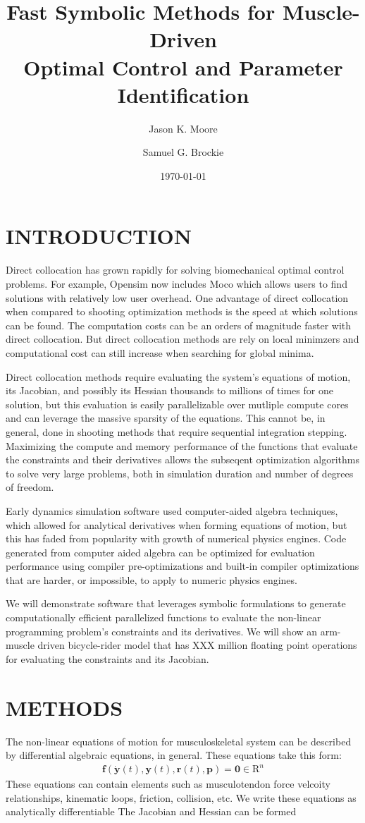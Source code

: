 \documentclass[11pt,twocolumn]{article}
\title{Fast Symbolic Methods for Muscle-Driven\\Optimal Control and Parameter
Identification}
\author{Jason K. Moore \and Samuel G. Brockie}
\date{\today}
\begin{document}
\maketitle
\section*{INTRODUCTION}
%
Direct collocation has grown rapidly for solving biomechanical optimal control
problems. For example, Opensim now includes Moco which allows users to find
solutions with relatively low user overhead. One advantage of direct
collocation when compared to shooting optimization methods is the speed at
which solutions can be found. The computation costs can be an orders of
magnitude faster with direct collocation. But direct collocation methods are
rely on local minimzers and computational cost can still increase when
searching for global minima.

Direct collocation methods require evaluating the system's equations of motion,
its Jacobian, and possibly its Hessian thousands to millions of times for one
solution, but this evaluation is easily parallelizable over mutliple compute
cores and can leverage the massive sparsity of the equations. This cannot be,
in general, done in shooting methods that require sequential integration
stepping. Maximizing the compute and memory performance of the functions that
evaluate the constraints and their derivatives allows the subseqent
optimization algorithms to solve very large problems, both in simulation
duration and number of degrees of freedom.

Early dynamics simulation software used computer-aided algebra techniques,
which allowed for analytical derivatives when forming equations of motion, but
this has faded from popularity with growth of numerical physics engines. Code
generated from computer aided algebra can be optimized for evaluation
performance using compiler pre-optimizations and built-in compiler
optimizations that are harder, or impossible, to apply to numeric physics
engines.

We will demonstrate software that leverages symbolic formulations to generate
computationally efficient parallelized functions to evaluate the non-linear
programming problem's constraints and its derivatives. We will show an
arm-muscle driven bicycle-rider model that has XXX million floating point
operations for evaluating the constraints and its Jacobian.

\section*{METHODS}
%
The non-linear equations of motion for musculoskeletal system can be described
by differential algebraic equations, in general. These equations take this
form:
%
\begin{align}
  \mathbf{f}(\dot{\mathbf{y}}(t), \mathbf{y}(t), \mathbf{r}(t), \mathbf{p}) =
  \mathbf{0} \in \mathrm{R}^n
\end{align}
%
These equations can contain elements such as musculotendon force velcoity
relationships, kinematic loops, friction, collision, etc. We write these
equations as analytically differentiable The Jacobian and
Hessian can be formed
\end{document}
